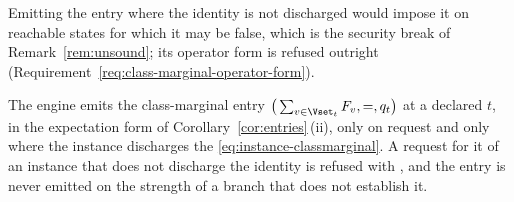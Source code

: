 
Emitting the entry where the identity is not discharged would impose it on
reachable states for which it may be false, which is the security break of
Remark~\ref{rem:unsound}; its operator form is refused outright
(Requirement~\ref{req:class-marginal-operator-form}).

\begin{requirement}\label{req:class-marginal-entry}
The engine emits the class-marginal entry $\big(\sum_{v\in\Vset_t}F_v,=,q_t\big)$
at a declared $t$, in the expectation form of
Corollary~\ref{cor:entries}\,(ii), only on request and only where the
instance discharges the 
\eqref{eq:instance-classmarginal}. A request for it of an instance that does
not discharge the identity is refused with
, and the entry is never emitted on the
strength of a branch that does not establish it.
\end{requirement}
